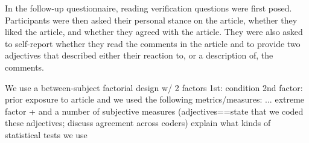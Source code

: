 In the follow-up questionnaire, reading verification questions were first posed. Participants were then asked their personal stance on the article, whether they liked the article, and whether they agreed with the article. They were also asked to self-report whether they read the comments in the article and to provide two adjectives that described either their reaction to, or a description of, the comments.

We use a between-subject factorial design w/ 2 factors
1st: condition
2nd factor: prior exposure to article
and we used the following metrics/measures: ... extreme factor + and a number of subjective measures (adjectives==state that we coded these adjectives; discuss agreement across coders)
explain what kinds of statistical tests we use
